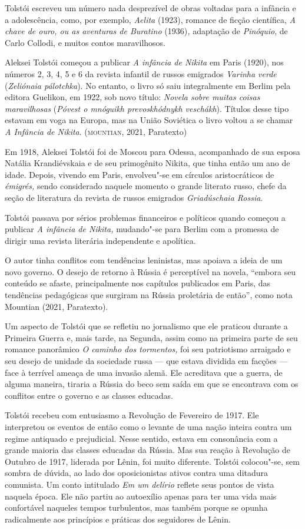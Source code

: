 \documentclass[11pt]{extarticle}
\begin{document}
Tolstói escreveu um número nada desprezível de obras voltadas para a
infância e a adolescência, como, por exemplo, \emph{Aelita} (1923),
romance de ficção científica, \emph{A chave de ouro, ou as
aventuras de Buratino} (1936)\emph{,} adaptação de \emph{Pinóquio}, de
Carlo Collodi, e muitos contos maravilhosos.

Aleksei Tolstói começou a publicar \emph{A infância de Nikita} em Paris
(1920), nos números 2, 3, 4, 5 e 6 da revista infantil de russos
emigrados \emph{Varinha verde} (\emph{Zeliónaia pálotchka}). No entanto,
o livro só saiu integralmente em Berlim pela editora Guelikon, em 1922,
sob novo título: \emph{Novela sobre muitas coisas maravilhosas}
(\emph{Póvest o mnóguikh prevoskhódnykh veschákh}). Títulos desse tipo
estavam em voga na Europa, mas na União Soviética o livro voltou a se
chamar \emph{A Infância de Nikita}. (\textsc{mountian}, 2021, Paratexto)

Em 1918, Aleksei Tolstói foi de Moscou para Odessa, acompanhado de sua
esposa Natália Krandiévskaia e de seu primogênito Nikita, que tinha
então um ano de idade. Depois, vivendo em Paris, envolveu"-se em círculos
aristocráticos de \emph{émigrés,} sendo considerado naquele momento o
grande literato russo, chefe da seção de literatura da revista de russos
emigrados \emph{Griadúschaia Rossia}.

Tolstói passava por sérios problemas financeiros e políticos quando
começou a publicar \emph{A infância de Nikita,} mudando"-se para Berlim
com a promessa de dirigir uma revista literária independente e
apolítica.

O autor tinha conflitos com tendências leninistas, mas apoiava a ideia
de um novo governo. O desejo de retorno à Rússia é perceptível na
novela, ``embora seu conteúdo se afaste, principalmente nos capítulos
publicados em Paris, das tendências pedagógicas que surgiram na Rússia
proletária de então'', como nota Mountian (2021, Paratexto).

Um aspecto de Tolstói que se refletiu no jornalismo que ele praticou
durante a Primeira Guerra e, mais tarde, na Segunda, assim como na
primeira parte de seu romance panorâmico \emph{O caminho dos tormentos,}
foi seu patriotismo arraigado e seu desejo de unidade da sociedade russa
--- que estava dividida em facções --- face à terrível ameaça de uma
invasão alemã. Ele acreditava que a guerra, de alguma maneira, tiraria a
Rússia do beco sem saída em que se encontrava com os conflitos entre o
governo e as classes educadas.

Tolstói recebeu com entusiasmo a Revolução de Fevereiro de 1917. Ele
interpretou os eventos de então como o levante de uma nação inteira
contra um regime antiquado e prejudicial. Nesse sentido, estava em
consonância com a grande maioria das classes educadas da Rússia. Mas sua
reação à Revolução de Outubro de 1917, liderada por Lênin, foi muito
diferente. Tolstói colocou"-se, sem sombra de dúvida, ao lado dos
oposicionistas ativos contra uma ditadura comunista. Um conto intitulado
\emph{Em um delírio} reflete seus pontos de vista naquela época. Ele não
partiu ao autoexílio apenas para ter uma vida mais confortável naqueles
tempos turbulentos, mas também porque se opunha radicalmente aos
princípios e práticas dos seguidores de Lênin.
\end{document}
